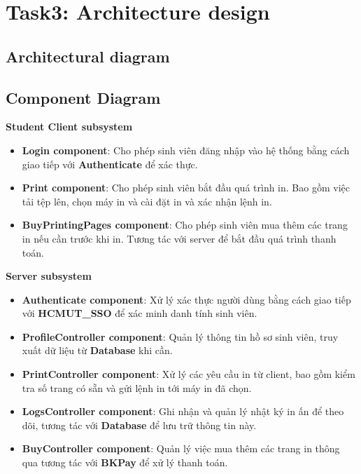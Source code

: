 \section{Task3: Architecture design}
\subsection{Architectural diagram}

\newpage
\subsection{Component Diagram}
\textbf{Student Client subsystem}
\begin{itemize}
    \item \textbf{Login component}: Cho phép sinh viên đăng nhập vào hệ thống bằng cách giao tiếp với \textbf{Authenticate} để xác thực.
    \item \textbf{Print component}: Cho phép sinh viên bắt đầu quá trình in. Bao gồm việc tải tệp lên, chọn máy in và cài đặt in và xác nhận lệnh in.
    \item \textbf{BuyPrintingPages component}: Cho phép sinh viên mua thêm các trang in nếu cần trước khi in. Tương tác với server để bắt đầu quá trình thanh toán.
\end{itemize}

\textbf{Server subsystem}
\begin{itemize}
    \item \textbf{Authenticate component}: Xử lý xác thực người dùng bằng cách giao tiếp với \textbf{HCMUT\_SSO} để xác minh danh tính sinh viên.
    \item \textbf{ProfileController component}: Quản lý thông tin hồ sơ sinh viên, truy xuất dữ liệu từ \textbf{Database} khi cần.
    \item \textbf{PrintController component}: Xử lý các yêu cầu in từ client, bao gồm kiểm tra số trang có sẵn và gửi lệnh in tới máy in đã chọn.
    \item \textbf{LogsController component}: Ghi nhận và quản lý nhật ký in ấn để theo dõi, tương tác với \textbf{Database} để lưu trữ thông tin này.
    \item \textbf{BuyController component}: Quản lý việc mua thêm các trang in thông qua tương tác với \textbf{BKPay} để xử lý thanh toán.
\end{itemize}

